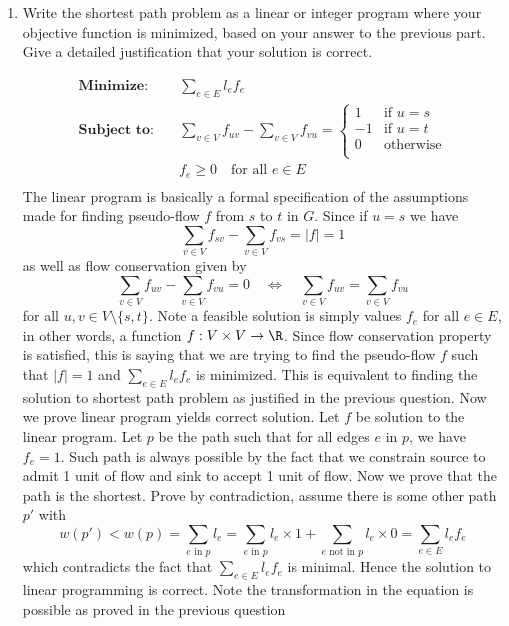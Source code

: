 \documentclass[11pt]{article}
\begin{document}
\begin{enumerate}
\begin{solution}
    \end{solution}
    \item Write the shortest path problem as a linear or integer program where your objective function is minimized, based on your answer to the previous part. Give a detailed justification that your solution is correct.
    \begin{solution}
        \begin{align*}
            \textbf{Minimize:}\quad & \sum_{e\in E}l_e f_e \\
            \textbf{Subject to:}\quad & \sum_{v\in V} f_{uv} - \sum_{v\in V} f_{vu} = 
                                      \begin{cases}
                                          1 & \text{if } u = s\\
                                          -1 & \text{if } u = t \\
                                          0 & \text{otherwise}  \\
                                      \end{cases}\\
                                \quad & f_e \geq 0 \quad \text{for all } e\in E\\
        \end{align*}
        The linear program is basically a formal specification of the assumptions made for finding pseudo-flow $f$ from $s$ to $t$ in $G$. Since if $u=s$ we have 
        \[
            \sum_{v\in V} f_{sv} - \sum_{v\in V} f_{vs} = |f| = 1
        \]
        as well as flow conservation given by
        \[
            \sum_{v\in V} f_{uv} - \sum_{v\in V} f_{vu} = 0 \quad \iff \quad  \sum_{v\in V} f_{uv} = \sum_{v\in V} f_{vu}
        \]
        for all $u,v\in V\setminus \{ s,t\}$. Note a feasible solution is simply values $f_e$ for all $e\in E$, in other words, a function $f:V\times V\to\R$. Since flow conservation property is satisfied, this is saying that we are trying to find the pseudo-flow $f$ such that $|f| = 1$ and $\sum_{e\in E}l_e f_e$ is minimized. This is equivalent to finding the solution to shortest path problem as justified in the previous question. Now we prove linear program yields correct solution. Let $f$ be solution to the linear program. Let $p$ be the path such that for all edges $e$ in $p$, we have $f_e = 1$. Such path is always possible by the fact that we constrain source to admit 1 unit of flow and sink to accept 1 unit of flow. Now we prove that the path is the shortest. Prove by contradiction, assume there is some other path $p'$ with
        \[
            w(p') < w(p) = \sum_{e \text{ in } p} l_e = \sum_{e \text{ in } p} l_e \times 1 + \sum_{e\text{ not in } p} l_e \times 0 = \sum_{e\in E}l_e f_e
        \] 
        which contradicts the fact that $\sum_{e\in E}l_e f_e$ is minimal. Hence the solution to linear programming is correct. Note the transformation in the equation is possible as proved in the previous question
    \end{solution}

\end{enumerate}
\end{document}
